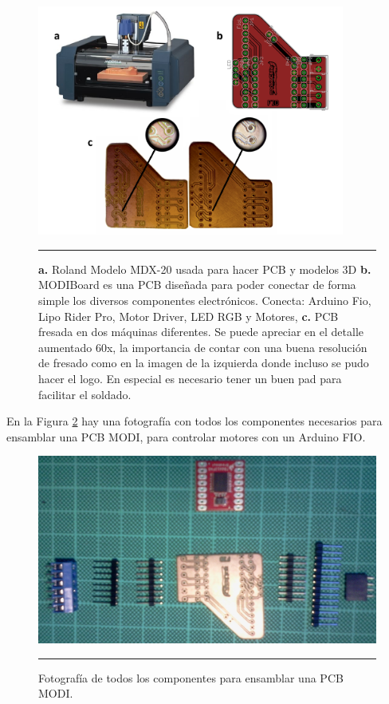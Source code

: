 \begin{figure}[htbp]
	\centering
		\includegraphics[width=0.9\textwidth]{./Figures/modi/pcb.png}
		\rule{35em}{0.5pt}
	\caption[Fabricación de PCB]{\textbf{a.} Roland Modelo MDX-20 usada para hacer PCB y modelos 3D \textbf{b.} MODIBoard es una PCB diseñada para poder conectar de forma simple los diversos componentes electrónicos. Conecta: Arduino Fio, Lipo Rider Pro, Motor Driver, LED RGB y Motores, \textbf{c. }PCB fresada en dos máquinas diferentes. Se puede apreciar en el detalle aumentado 60x, la importancia de contar con una buena resolución de fresado como en la imagen de la izquierda donde incluso se pudo hacer el logo. En especial es necesario tener un buen pad para facilitar el soldado.}
	\label{fig:pcb}
\end{figure}

En la Figura \ref{fig:ComponentesPCB} hay una fotografía con todos los componentes necesarios para ensamblar una PCB MODI, para controlar motores con un Arduino FIO.

\begin{figure}[htbp]
	\centering
		\includegraphics[width=\textwidth]{./Pictures/soldado.jpg}
		\rule{35em}{0.5pt}
	\caption[Componentes PCB MODI antes de soldar]{Fotografía de todos los componentes para ensamblar una PCB MODI.}
	\label{fig:ComponentesPCB}
\end{figure}	


